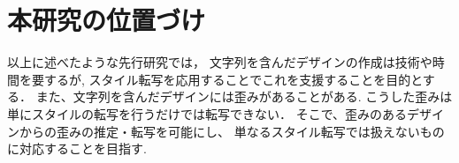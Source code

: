\documentclass[\homedir/main.tex]{subfiles}
\begin{document}
\cite{icpram20}

\cite{oai:irdb.nii.ac.jp:01211:0005350653}


\section{本研究の位置づけ}\label{sec:positioning}
以上に述べたような先行研究では，
文字列を含んだデザインの作成は技術や時間を要するが,
スタイル転写を応用することでこれを支援することを目的とする．
また、文字列を含んだデザインには歪みがあることがある.
こうした歪みは単にスタイルの転写を行うだけでは転写できない．
そこで、歪みのあるデザインからの歪みの推定・転写を可能にし、
単なるスタイル転写では扱えないものに対応することを目指す.


\printBibForSubfiles
\end{document}

